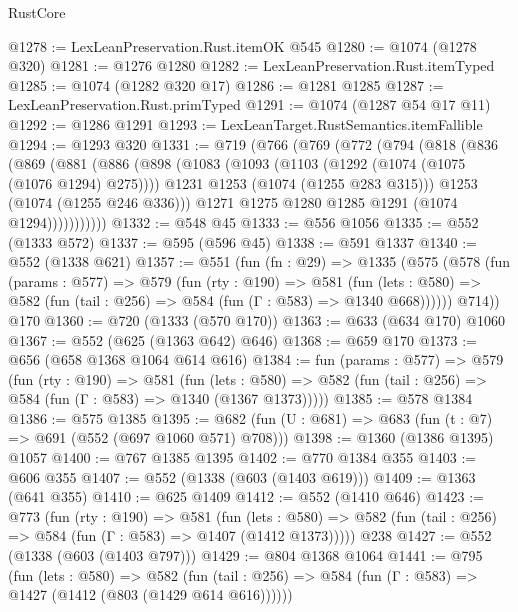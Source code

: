 \begin{lexlean}{RustCore}
\begin{coremodule}
@1278 := LexLeanPreservation.Rust.itemOK @545
@1280 := @1074 (@1278 @320)
@1281 := @1276 @1280
@1282 := LexLeanPreservation.Rust.itemTyped
@1285 := @1074 (@1282 @320 @17)
@1286 := @1281 @1285
@1287 := LexLeanPreservation.Rust.primTyped
@1291 := @1074 (@1287 @54 @17 @11)
@1292 := @1286 @1291
@1293 := LexLeanTarget.RustSemantics.itemFallible
@1294 := @1293 @320
@1331 := @719
    (@766
      (@769
        (@772
          (@794
            (@818
              (@836
                (@869
                  (@881
                    (@886
                      (@898
                        (@1083
                          (@1093
                            (@1103 (@1292 (@1074 (@1075 (@1076 @1294) @275))))
                            @1231
                            @1253
                            (@1074 (@1255 @283 @315)))
                          @1253
                          (@1074 (@1255 @246 @336)))
                        @1271
                        @1275
                        @1280
                        @1285
                        @1291
                        (@1074 @1294)))))))))))
@1332 := @548 @45
@1333 := @556 @1056
@1335 := @552 (@1333 @572)
@1337 := @595 (@596 @45)
@1338 := @591 @1337
@1340 := @552 (@1338 @621)
@1357 := @551
    (fun (fn : @29) =>
    @1335
      (@575
        (@578
          (fun (params : @577) =>
          @579
            (fun (rty : @190) =>
            @581
              (fun (lets : @580) =>
              @582 (fun (tail : @256) => @584 (fun (Γ : @583) => @1340 @668))))))
        @714))
    @170
@1360 := @720 (@1333 (@570 @170))
@1363 := @633 (@634 @170) @1060
@1367 := @552 (@625 (@1363 @642) @646)
@1368 := @659 @170
@1373 := @656 (@658 @1368 @1064 @614 @616)
@1384 := fun (params : @577) =>
  @579
    (fun (rty : @190) =>
    @581
      (fun (lets : @580) =>
      @582 (fun (tail : @256) => @584 (fun (Γ : @583) => @1340 (@1367 @1373)))))
@1385 := @578 @1384
@1386 := @575 @1385
@1395 := @682 (fun (U : @681) => @683 (fun (t : @7) => @691 (@552 (@697 @1060 @571) @708)))
@1398 := @1360 (@1386 @1395) @1057
@1400 := @767 @1385 @1395
@1402 := @770 @1384 @355
@1403 := @606 @355
@1407 := @552 (@1338 (@603 (@1403 @619)))
@1409 := @1363 (@641 @355)
@1410 := @625 @1409
@1412 := @552 (@1410 @646)
@1423 := @773
    (fun (rty : @190) =>
    @581
      (fun (lets : @580) =>
      @582 (fun (tail : @256) => @584 (fun (Γ : @583) => @1407 (@1412 @1373)))))
    @238
@1427 := @552 (@1338 (@603 (@1403 @797)))
@1429 := @804 @1368 @1064
@1441 := @795
    (fun (lets : @580) =>
    @582 (fun (tail : @256) => @584 (fun (Γ : @583) => @1427 (@1412 (@803 (@1429 @614 @616))))))

\end{coremodule}
\end{lexlean}
